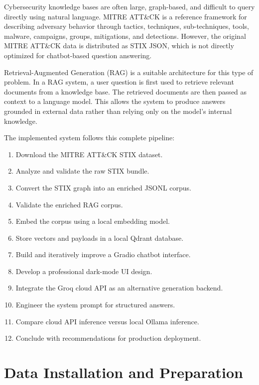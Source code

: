 \documentclass[12pt,a4paper]{report}
\newcommand{\ATTACK}{MITRE ATT\&CK}
\begin{document}
Cybersecurity knowledge bases are often large, graph-based, and difficult to query directly using natural language. \ATTACK{} is a reference framework for describing adversary behavior through tactics, techniques, sub-techniques, tools, malware, campaigns, groups, mitigations, and detections. However, the original \ATTACK{} data is distributed as STIX JSON, which is not directly optimized for chatbot-based question answering.

Retrieval-Augmented Generation (RAG) is a suitable architecture for this type of problem. In a RAG system, a user question is first used to retrieve relevant documents from a knowledge base. The retrieved documents are then passed as context to a language model. This allows the system to produce answers grounded in external data rather than relying only on the model's internal knowledge.

The implemented system follows this complete pipeline:

\begin{enumerate}
    \item Download the \ATTACK{} STIX dataset.
    \item Analyze and validate the raw STIX bundle.
    \item Convert the STIX graph into an enriched JSONL corpus.
    \item Validate the enriched RAG corpus.
    \item Embed the corpus using a local embedding model.
    \item Store vectors and payloads in a local Qdrant database.
    \item Build and iteratively improve a Gradio chatbot interface.
    \item Develop a professional dark-mode UI design.
    \item Integrate the Groq cloud API as an alternative generation backend.
    \item Engineer the system prompt for structured answers.
    \item Compare cloud API inference versus local Ollama inference.
    \item Conclude with recommendations for production deployment.
\end{enumerate}


\chapter{Data Installation and Preparation}
\end{document}
